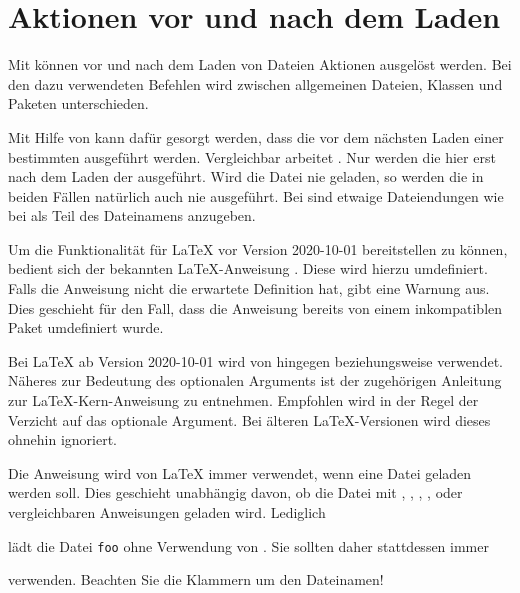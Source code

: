 \section{Aktionen vor und nach dem Laden}

Mit  können vor und nach dem Laden von Dateien Aktionen
ausgelöst werden. Bei den dazu verwendeten Befehlen wird zwischen allgemeinen
Dateien, Klassen und Paketen unterschieden.


\begin{Declaration}
\end{Declaration}%
Mit Hilfe von  kann dafür gesorgt werden, dass die
 vor dem nächsten Laden einer bestimmten 
ausgeführt werden. Vergleichbar arbeitet . Nur werden die
 hier erst nach dem Laden der 
ausgeführt. Wird die Datei nie geladen, so werden die  in
beiden Fällen natürlich auch nie ausgeführt. Bei  sind etwaige
Dateiendungen wie bei  als Teil des Dateinamens anzugeben.

Um die Funktionalität für \LaTeX{} vor Version 2020-10-01 bereitstellen zu
können, bedient sich  der bekannten
\LaTeX-Anweisung . Diese wird
hierzu umdefiniert.  Falls die Anweisung nicht die erwartete Definition hat,
gibt  eine Warnung aus.  Dies geschieht für
den Fall, dass die Anweisung bereits von einem inkompatiblen Paket umdefiniert
wurde.

Bei \LaTeX{} ab
Version 2020-10-01 wird von  hingegen
beziehungsweise
verwendet. Näheres zur Bedeutung des optionalen Arguments  ist
der zugehörigen Anleitung zur \LaTeX-Kern-Anweisung  zu
entnehmen. Empfohlen wird in der Regel der Verzicht auf das optionale
Argument. Bei älteren \LaTeX-Versionen wird dieses ohnehin ignoriert.
  
Die Anweisung  wird von \LaTeX{} immer verwendet,
wenn eine Datei geladen werden soll. Dies geschieht unabhängig davon, ob die
Datei mit , , ,
,  oder vergleichbaren Anweisungen
geladen wird. Lediglich
\begin{lstcode}
  
\end{lstcode}
lädt die Datei \texttt{foo} ohne Verwendung von . Sie
sollten daher stattdessen immer
\begin{lstcode}
  
\end{lstcode}
verwenden. Beachten Sie die Klammern um den Dateinamen!%
%
\EndIndexGroup


